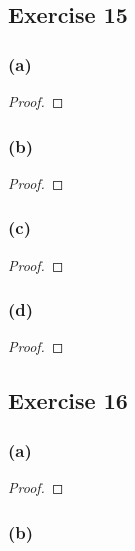 \documentclass[14pt]{extarticle}
\begin{document}
\subsection{Exercise 15}

\subsubsection{(a)}

\begin{proof}

\end{proof}

\subsubsection{(b)}

\begin{proof}

\end{proof}

\subsubsection{(c)}

\begin{proof}

\end{proof}

\subsubsection{(d)}

\begin{proof}

\end{proof}

\subsection{Exercise 16}

\subsubsection{(a)}

\begin{proof}

\end{proof}

\subsubsection{(b)}
\end{document}
